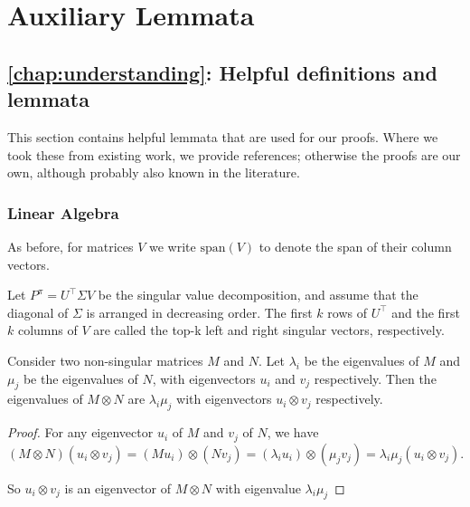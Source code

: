 \chapter{Auxiliary Lemmata}
\label{app:formal}

\section{\autoref{chap:understanding}: Helpful definitions and lemmata}

\label{app:formal:understanding}

This section contains helpful lemmata that are used for our proofs.
Where we took these from existing work, we provide references; otherwise the proofs are our own, although probably also known in the literature.

\subsection{Linear Algebra}
\label{app:formal:understanding:linalg}

As before, for matrices $V$ we write $\mathrm{span}(V)$ to denote the span of their column vectors. 

\begin{definition}\label{def:understanding:topk-single}
Let $P^\pi = U^\top \Sigma V$ be the singular value decomposition, and assume that the diagonal of $\Sigma$ is arranged in decreasing order.
The first $k$ rows of $U^\top$ and the first $k$ columns of $V$ are called the top-k left and right singular vectors, respectively.
\end{definition}

\begin{lemma}\label{lem:understanding:spectrum_kronecker}
    Consider two non-singular matrices $M$ and $N$. Let $\lambda_i$ be the eigenvalues of $M$ and $\mu_j$ be the eigenvalues of $N$, with eigenvectors $u_i$ and $v_j$ respectively. Then the eigenvalues of $M\otimes N$ are $\lambda_i\mu_j$ with eigenvectors $u_i \otimes v_j$ respectively.
\end{lemma}

\begin{proof}
For any eigenvector $u_i$ of $M$ and $v_j$ of $N$, we have
    $$\left(M\otimes N\right) \left(u_i \otimes v_j\right) = \left(M u_i\right) \otimes \left(N v_j\right) = \left(\lambda_i u_i\right)\otimes\left(\mu_j v_j\right) = \lambda_i\mu_j \left(u_i \otimes v_j\right).$$

    So $u_i\otimes v_j$ is an eigenvector of $M\otimes N$ with eigenvalue $\lambda_i \mu_j$
\end{proof}

